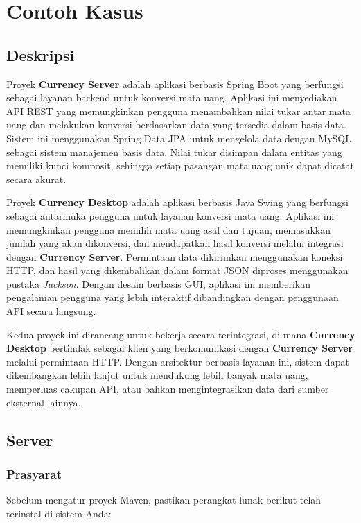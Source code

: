 \section{Contoh Kasus}

\subsection{Deskripsi}
Proyek \textbf{Currency Server} adalah aplikasi berbasis Spring Boot yang berfungsi sebagai layanan backend untuk konversi mata uang. Aplikasi ini menyediakan API REST yang memungkinkan pengguna menambahkan nilai tukar antar mata uang dan melakukan konversi berdasarkan data yang tersedia dalam basis data. Sistem ini menggunakan Spring Data JPA untuk mengelola data dengan MySQL sebagai sistem manajemen basis data. Nilai tukar disimpan dalam entitas yang memiliki kunci komposit, sehingga setiap pasangan mata uang unik dapat dicatat secara akurat. 

Proyek \textbf{Currency Desktop} adalah aplikasi berbasis Java Swing yang berfungsi sebagai antarmuka pengguna untuk layanan konversi mata uang. Aplikasi ini memungkinkan pengguna memilih mata uang asal dan tujuan, memasukkan jumlah yang akan dikonversi, dan mendapatkan hasil konversi melalui integrasi dengan \textbf{Currency Server}. Permintaan data dikirimkan menggunakan koneksi HTTP, dan hasil yang dikembalikan dalam format JSON diproses menggunakan pustaka \textit{Jackson}. Dengan desain berbasis GUI, aplikasi ini memberikan pengalaman pengguna yang lebih interaktif dibandingkan dengan penggunaan API secara langsung.

Kedua proyek ini dirancang untuk bekerja secara terintegrasi, di mana \textbf{Currency Desktop} bertindak sebagai klien yang berkomunikasi dengan \textbf{Currency Server} melalui permintaan HTTP. Dengan arsitektur berbasis layanan ini, sistem dapat dikembangkan lebih lanjut untuk mendukung lebih banyak mata uang, memperluas cakupan API, atau bahkan mengintegrasikan data dari sumber eksternal lainnya.

\subsection{Server}

\subsubsection{Prasyarat}
Sebelum mengatur proyek Maven, pastikan perangkat lunak berikut telah terinstal di sistem Anda:

